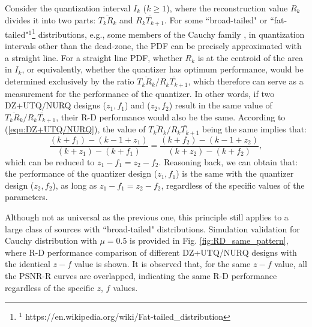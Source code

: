 \documentclass[smallabstract,smallcaptions]{dccpaper}
\begin{document}
Consider the quantization interval $I_k$ ($k \ge 1$), where the reconstruction value $R_k$ divides it into two parts: $\overline{T_k R_k}$ and $\overline{R_k T_{k+1}}$. For some ``broad-tailed" or ``fat-tailed"$^1$\footnote{$^1$ https://en.wikipedia.org/wiki/Fat-tailed\_distribution} distributions, e.g., some members of the Cauchy family \cite{Farvardin_TIT1984}, in quantization intervals other than the dead-zone, the PDF can be precisely approximated with a straight line. For a straight line PDF, whether $R_k$ is at the centroid of the area in $I_k$, or equivalently, whether the quantizer has optimum performance, would be determined exclusively by the ratio $\overline{T_k R_k} / \overline{R_k T_{k+1}}$, which therefore can serve as a measurement for the performance of the quantizer. In other words, if two DZ+UTQ/NURQ designs ($z_1, f_1$) and ($z_2, f_2$) result in the same value of $\overline{T_k R_k} / \overline{R_k T_{k+1}}$, their R-D performance would also be the same. According to (\ref{equ:DZ+UTQ/NURQ}), the value of $\overline{T_k R_k} / \overline{R_k T_{k+1}}$ being the same implies that:
\begin{equation}\label{equ:formula-ratio}
\frac{(k+f_1)-(k-1+z_1)}{(k+z_1)-(k+f_1)} = \frac{(k+f_2)-(k-1+z_2)}{(k+z_2)-(k+f_2)},
\end{equation}
which can be reduced to $z_1 - f_1 = z_2 - f_2$. Reasoning back, we can obtain that: the performance of the quantizer design ($z_1, f_1$) is the same with the quantizer design ($z_2, f_2$), as long as $z_1 - f_1 = z_2 - f_2$, regardless of the specific values of the parameters.

Although not as universal as the previous one, this principle still applies to a large class of sources with ``broad-tailed" distributions. Simulation validation for Cauchy distribution with $\mu = 0.5$ is provided in Fig. \ref{fig:RD_same_pattern}, where R-D performance comparison of different DZ+UTQ/NURQ designs with the identical $z-f$ value is shown. It is observed that, for the same $z-f$ value, all the PSNR-R curves are overlapped, indicating the same R-D performance regardless of the specific $z$, $f$ values.
\end{document}
